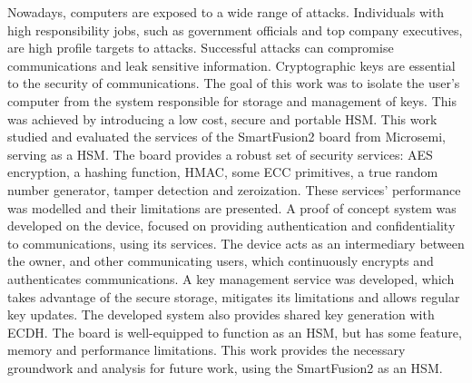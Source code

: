 \noindent Nowadays, computers are exposed to a wide range of attacks. Individuals with high responsibility jobs, such as government officials and top company executives, are high profile targets to attacks. Successful attacks can compromise communications and leak sensitive information. Cryptographic keys are essential to the security of communications. The goal of this work was to isolate the user's computer from the system responsible for storage and management of keys. This was achieved by introducing a low cost, secure and portable \ac{HSM}. This work studied and evaluated the services of the SmartFusion2 board from Microsemi, serving as a HSM. The board provides a robust set of security services: AES encryption, a hashing function, HMAC, some ECC primitives, a true random number generator, tamper detection and zeroization. These services' performance was modelled and their limitations are presented. A proof of concept system was developed on the device, focused on providing authentication and confidentiality to communications, using its services. The device acts as an intermediary between the owner, and other communicating users, which continuously encrypts and authenticates communications. A key management service was developed, which takes advantage of the secure storage, mitigates its limitations and allows regular key updates. The developed system also provides shared key generation with ECDH. The board is well-equipped to function as an HSM, but has some feature, memory and performance limitations. This work provides the necessary groundwork and analysis for future work, using the SmartFusion2 as an HSM.
